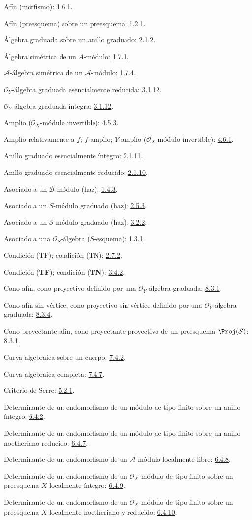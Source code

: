 \documentclass[oneside,10pt]{amsart}
\begin{document}
\begingroup
\small
\setlength{\parindent}{0pt}
\setlength{\parskip}{2pt}
\newcommand{\egaTerm}[2]{#1: #2.\par}

\egaTerm{Afín (morfismo)}{\hyperref[II.1.6.1-fr]{1.6.1}}
\egaTerm{Afín (preesquema) sobre un preesquema}{\hyperref[II.1.2.1-fr]{1.2.1}}
\egaTerm{Álgebra graduada sobre un anillo graduado}{\hyperref[II.2.1.2-fr]{2.1.2}}
\egaTerm{Álgebra simétrica de un $A$-módulo}{\hyperref[II.1.7.1-fr]{1.7.1}}
\egaTerm{$\mathcal{A}$-álgebra simétrica de un $\mathcal{A}$-módulo}{\hyperref[II.1.7.4-fr]{1.7.4}}
\egaTerm{$\mathcal{O}_Y$-álgebra graduada esencialmente reducida}{\hyperref[II.3.1.12-fr]{3.1.12}}
\egaTerm{$\mathcal{O}_Y$-álgebra graduada íntegra}{\hyperref[II.3.1.12-fr]{3.1.12}}
\egaTerm{Amplio ($\mathcal{O}_X$-módulo invertible)}{\hyperref[II.4.5.3-fr]{4.5.3}}
\egaTerm{Amplio relativamente a $f$; $f$-amplio; $Y$-amplio ($\mathcal{O}_X$-módulo invertible)}{\hyperref[II.4.6.1-fr]{4.6.1}}
\egaTerm{Anillo graduado esencialmente íntegro}{\hyperref[II.2.1.11-fr]{2.1.11}}
\egaTerm{Anillo graduado esencialmente reducido}{\hyperref[II.2.1.10-fr]{2.1.10}}
\egaTerm{Asociado a un $\mathcal{B}$-módulo (haz)}{\hyperref[II.1.4.3-fr]{1.4.3}}
\egaTerm{Asociado a un $S$-módulo graduado (haz)}{\hyperref[II.2.5.3-fr]{2.5.3}}
\egaTerm{Asociado a un $\mathcal{S}$-módulo graduado (haz)}{\hyperref[II.3.2.2-fr]{3.2.2}}
\egaTerm{Asociado a una $\mathcal{O}_S$-álgebra ($S$-esquema)}{\hyperref[II.1.3.1-fr]{1.3.1}}

\egaTerm{Condición (TF); condición (TN)}{\hyperref[II.2.7.2-fr]{2.7.2}}
\egaTerm{Condición (\textbf{TF}); condición (\textbf{TN})}{\hyperref[II.3.4.2-fr]{3.4.2}}
\egaTerm{Cono afín, cono proyectivo definido por una $\mathcal{O}_Y$-álgebra graduada}{\hyperref[II.8.3.1-fr]{8.3.1}}
\egaTerm{Cono afín sin vértice, cono proyectivo sin vértice definido por una $\mathcal{O}_Y$-álgebra graduada}{\hyperref[II.8.3.4-fr]{8.3.4}}
\egaTerm{Cono proyectante afín, cono proyectante proyectivo de un preesquema $\Proj(\mathcal{S})$}{\hyperref[II.8.3.1-fr]{8.3.1}}
\egaTerm{Curva algebraica sobre un cuerpo}{\hyperref[II.7.4.2-fr]{7.4.2}}
\egaTerm{Curva algebraica completa}{\hyperref[II.7.4.7-fr]{7.4.7}}
\egaTerm{Criterio de Serre}{\hyperref[II.5.2.1-fr]{5.2.1}}

\egaTerm{Determinante de un endomorfismo de un módulo de tipo finito sobre un anillo íntegro}{\hyperref[II.6.4.2-fr]{6.4.2}}
\egaTerm{Determinante de un endomorfismo de un módulo de tipo finito sobre un anillo noetheriano reducido}{\hyperref[II.6.4.7-fr]{6.4.7}}
\egaTerm{Determinante de un endomorfismo de un $\mathcal{A}$-módulo localmente libre}{\hyperref[II.6.4.8-fr]{6.4.8}}
\egaTerm{Determinante de un endomorfismo de un $\mathcal{O}_X$-módulo de tipo finito sobre un preesquema $X$ localmente íntegro}{\hyperref[II.6.4.9-fr]{6.4.9}}
\egaTerm{Determinante de un endomorfismo de un $\mathcal{O}_X$-módulo de tipo finito sobre un preesquema $X$ localmente noetheriano y reducido}{\hyperref[II.6.4.10-fr]{6.4.10}}
\end{document}
